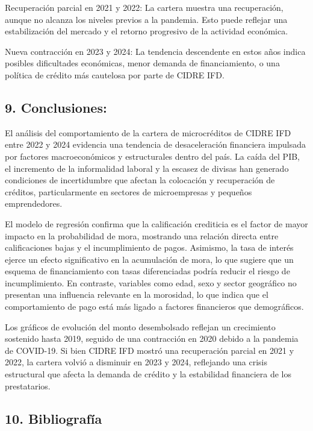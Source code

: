 \documentclass[Royal,times,sageh]{sagej}
\begin{document}
Recuperación parcial en 2021 y 2022: La cartera muestra una
recuperación, aunque no alcanza los niveles previos a la pandemia. Esto
puede reflejar una estabilización del mercado y el retorno progresivo de
la actividad económica.

Nueva contracción en 2023 y 2024: La tendencia descendente en estos años
indica posibles dificultades económicas, menor demanda de
financiamiento, o una política de crédito más cautelosa por parte de
CIDRE IFD.

\subsection{\texorpdfstring{9.
\textbf{Conclusiones:}}{9. Conclusiones:}}\label{conclusiones}

El análisis del comportamiento de la cartera de microcréditos de CIDRE
IFD entre 2022 y 2024 evidencia una tendencia de desaceleración
financiera impulsada por factores macroeconómicos y estructurales dentro
del país. La caída del PIB, el incremento de la informalidad laboral y
la escasez de divisas han generado condiciones de incertidumbre que
afectan la colocación y recuperación de créditos, particularmente en
sectores de microempresas y pequeños emprendedores.

El modelo de regresión confirma que la calificación crediticia es el
factor de mayor impacto en la probabilidad de mora, mostrando una
relación directa entre calificaciones bajas y el incumplimiento de
pagos. Asimismo, la tasa de interés ejerce un efecto significativo en la
acumulación de mora, lo que sugiere que un esquema de financiamiento con
tasas diferenciadas podría reducir el riesgo de incumplimiento. En
contraste, variables como edad, sexo y sector geográfico no presentan
una influencia relevante en la morosidad, lo que indica que el
comportamiento de pago está más ligado a factores financieros que
demográficos.

Los gráficos de evolución del monto desembolsado reflejan un crecimiento
sostenido hasta 2019, seguido de una contracción en 2020 debido a la
pandemia de COVID-19. Si bien CIDRE IFD mostró una recuperación parcial
en 2021 y 2022, la cartera volvió a disminuir en 2023 y 2024, reflejando
una crisis estructural que afecta la demanda de crédito y la estabilidad
financiera de los prestatarios.

\subsection{10. Bibliografía}\label{bibliografuxeda}
\end{document}
